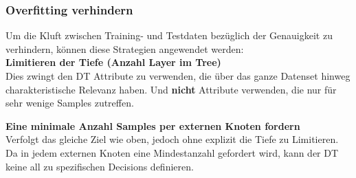 \newpage
\subsubsection{Overfitting verhindern}

Um die Kluft zwischen Training- und Testdaten bezüglich der Genauigkeit zu verhindern, können diese Strategien angewendet werden: \\

\textbf{Limitieren der Tiefe (Anzahl Layer im Tree)}\\
Dies zwingt den DT Attribute zu verwenden, die über das ganze Datenset hinweg charakteristische Relevanz haben. Und \textbf{nicht} Attribute verwenden, die nur für sehr wenige Samples zutreffen.



\textbf{Eine minimale Anzahl Samples per externen Knoten fordern}\\
Verfolgt das gleiche Ziel wie oben, jedoch ohne explizit die Tiefe zu Limitieren. Da in jedem externen Knoten eine Mindestanzahl gefordert wird, kann der DT keine all zu spezifischen Decisions definieren.

